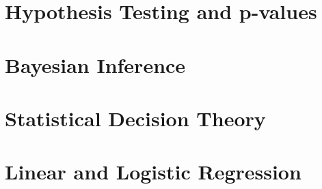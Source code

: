 \documentclass{article}
\begin{document}
\section{Hypothesis Testing and p-values}

\section{Bayesian Inference}

\section{Statistical Decision Theory}

\section{Linear and Logistic Regression}
\end{document}

